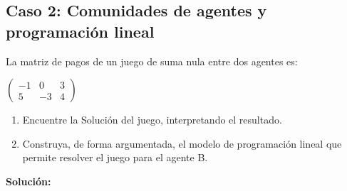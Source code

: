 \subsection{Caso 2: Comunidades de agentes y programación lineal}
La matriz de pagos de un juego de suma nula entre dos agentes es:
\begin{center}
  $  \begin{pmatrix}
    -1 & 0 & 3\\
    5 & -3 & 4
    \end{pmatrix}$
\end{center}

\begin{enumerate}
    \item Encuentre la Solución del juego, interpretando el resultado.
    \item Construya, de forma argumentada, el modelo de programación lineal que permite resolver el juego para el agente B.
\end{enumerate}
\textbf{Solución:}
\\

